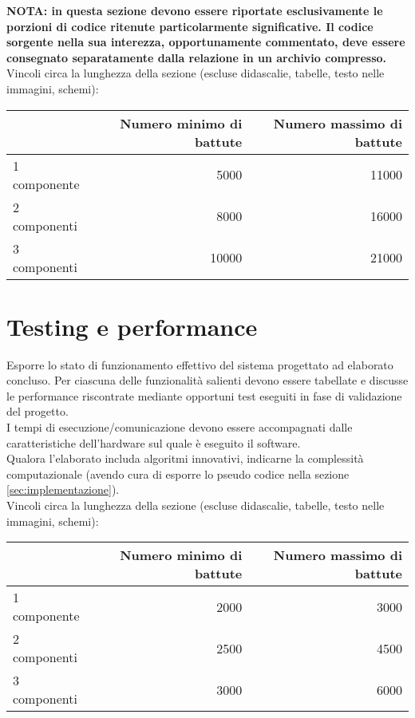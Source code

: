 \documentclass[12pt]{article}
\begin{document}
\textbf{NOTA: in questa sezione devono essere riportate esclusivamente le porzioni di codice ritenute particolarmente significative. Il codice sorgente nella sua interezza, opportunamente commentato, deve essere consegnato separatamente dalla relazione in un archivio compresso.}\\


Vincoli circa la lunghezza della sezione (escluse didascalie, tabelle, testo nelle immagini, schemi):

\vspace{1cm}
\begin{tabular}{l|rr}
 & Numero minimo di battute & Numero massimo di battute \\
 \hline
 1 componente & 5000 & 11000 \\
 2 componenti & 8000 & 16000 \\
 3 componenti & 10000 & 21000 \\
 \hline
\end{tabular}


\newpage



\section{Testing e performance}

Esporre lo stato di funzionamento effettivo del sistema progettato ad elaborato concluso. Per ciascuna delle funzionalità salienti devono essere tabellate e discusse le performance riscontrate mediante opportuni test eseguiti in fase di validazione del progetto.\\

I tempi di esecuzione/comunicazione devono essere accompagnati dalle caratteristiche dell'hardware sul quale è eseguito il software.\\

Qualora l'elaborato includa algoritmi innovativi, indicarne la complessità computazionale (avendo cura di esporre lo pseudo codice nella sezione \ref{sec:implementazione}).\\


Vincoli circa la lunghezza della sezione (escluse didascalie, tabelle, testo nelle immagini, schemi):

\vspace{1cm}
\begin{tabular}{l|rr}
 & Numero minimo di battute & Numero massimo di battute \\
 \hline
 1 componente & 2000 & 3000 \\
 2 componenti & 2500 & 4500 \\
 3 componenti & 3000 & 6000 \\
 \hline
\end{tabular}
\end{document}
